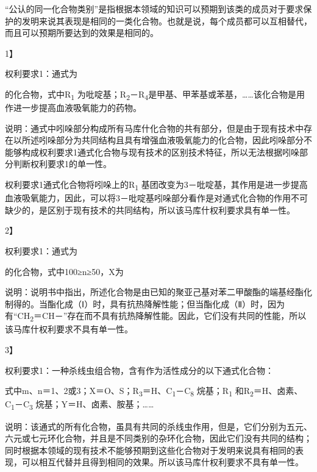 “公认的同一化合物类别”是指根据本领域的知识可以预期到该类的成员对于要求保护的发明来说其表现是相同的一类化合物。也就是说，每个成员都可以互相替代，而且可以预期所要达到的效果是相同的。

{1】\par}

权利要求1：通式为

的化合物，式中R\textsubscript{1} 为吡啶基；R\textsubscript{2}－R\textsubscript{4}是甲基、甲苯基或苯基，……该化合物是用作进一步提高血液吸氧能力的药物。

说明：通式中吲哚部分构成所有马库什化合物的共有部分，但是由于现有技术中存在以所述吲哚部分为共同结构且具有增强血液吸氧能力的化合物，因此吲哚部分不能够构成权利要求1通式化合物与现有技术的区别技术特征，所以无法根据吲哚部分判断权利要求1的单一性。

权利要求1通式化合物将吲哚上的R\textsubscript{1} 基团改变为3－吡啶基，其作用是进一步提高血液吸氧能力，因此，可以将3－吡啶基吲哚部分看作是对通式化合物的作用不可缺少的，是区别于现有技术的共同结构，所以该马库什权利要求具有单一性。

{2】\par}

权利要求1：通式为

的化合物，式中100≥n≥50，X为

说明：说明书中指出，所述化合物是由已知的聚亚己基对苯二甲酸酯的端基经酯化制得的。当酯化成（Ⅰ）时，具有抗热降解性能；但当酯化成（Ⅱ）时，因为有“CH\textsubscript{2}＝CH－”存在而不具有抗热降解性能。因此，它们没有共同的性能，所以该马库什权利要求不具有单一性。

{3】\par}

权利要求1：一种杀线虫组合物，含有作为活性成分的以下通式化合物：

式中m、n＝1、2或3；X＝O、S；R\textsubscript{3}＝H、C\textsubscript{1}－C\textsubscript{8} 烷基；R\textsubscript{1} 和R\textsubscript{2}＝H、卤素、C\textsubscript{1}－C\textsubscript{3} 烷基；Y＝H、卤素、胺基；……

说明：该通式的所有化合物，虽具有共同的杀线虫作用，但是，它们分别为五元、六元或七元环化合物，并且是不同类别的杂环化合物，因此它们没有共同的结构；同时根据本领域的现有技术不能够预期到这些化合物对于发明来说具有相同的表现，可以相互代替并且得到相同的效果。所以该马库什权利要求不具有单一性。


